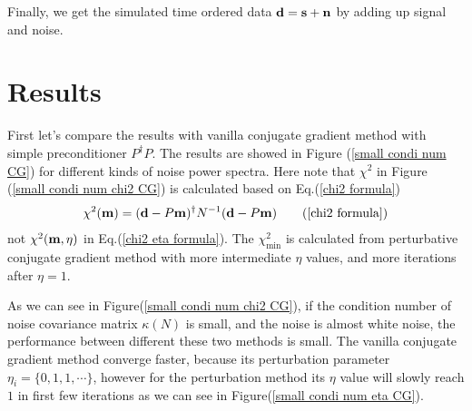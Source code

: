 \documentclass[11pt, letterpaper]{article}
\newcommand{\vbd}{\vb{d}}
\newcommand{\vbm}{\vb{m}}
\newcommand{\Pdagger}{P^{\dagger}}
\begin{document}
Finally, we get the simulated time ordered data $\vb{d} = \vb{s} + \vb{n}$ by
adding up signal and noise.

\section{Results}
First let's compare the results with vanilla conjugate gradient method with
simple preconditioner $\Pdagger P$.
The results are showed in Figure (\ref{small condi num CG}) for different kinds
of noise power spectra.
Here note that $\chi^2$ in Figure (\ref{small condi num chi2 CG}) is calculated
based on Eq.(\ref{chi2 formula})
\begin{align}
\chi^2(\vbm) = (\vbd - P\vbm)^{\dagger} N^{-1} (\vbd - P \vbm)
\tag{\ref{chi2 formula}}
\end{align}
not $\chi^2(\vbm, \eta)$ in Eq.(\ref{chi2 eta formula}).
The $\chi^2_{\text{min}}$ is calculated from perturbative conjugate gradient
method with more intermediate $\eta$ values, and more iterations after
$\eta=1$.

As we can see in Figure(\ref{small condi num chi2 CG}), if the condition number
of noise covariance matrix $\kappa(N)$ is small, and the noise is almost white
noise, the performance between different these two methods is small.  The vanilla conjugate gradient method converge faster, because its perturbation
parameter $\eta_{i}=\{0,1,1,\cdots\}$, however for the perturbation method its
$\eta$ value will slowly reach $1$ in first few iterations as we can see in
Figure(\ref{small condi num eta CG}).
\end{document}
